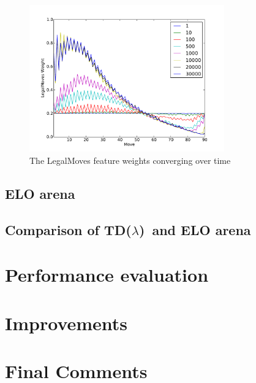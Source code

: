\documentclass[11pt]{article}
\newcommand{\tdl}{TD($\lambda$)}
\begin{document}
\begin{figure}[htbp]
  \centering
  \includegraphics[trim=0cm 0cm 1.5cm 1cm, clip, width=0.75\textwidth]
    {../Graphs/legalmovesprogression.pdf}
  \caption{The LegalMoves feature weights converging over time}
  \label{LegalMovesConvergence}
\end{figure}

\clearpage

\subsection{ELO arena}
\label{sub:elo_arena}

\subsection{Comparison of \tdl\ and ELO arena}
\label{sub:comparing_learning}

\section{Performance evaluation}
\label{sec:performance}

\section{Improvements}
\label{sec:improvements}

\section{Final Comments}
\label{sec:final_comments}




\end{document}
